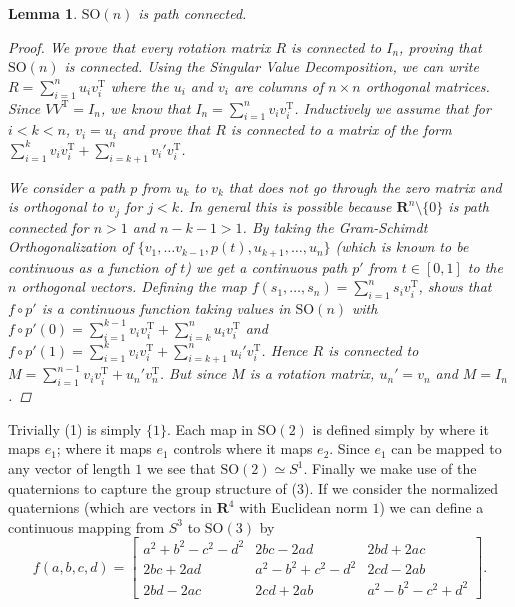 \documentclass[letterpaper,11pt]{article}
\newtheorem{lemma}{Lemma}
\newcommand{\Tr}{^\text{T}}
\newcommand{\reals}{\mathbf{R}}
\newcommand{\MG}[2]{{\text{#1}(#2)}}
\newcommand{\SOn}{\MG{SO}{n}}
\begin{document}
\begin{lemma}
$\SOn$ is path connected.
\begin{proof}
We prove that every rotation matrix $R$ is connected to $I_n$, proving that $\SOn$ is connected.
Using the Singular Value Decomposition, we can write $R = \sum_{i=1}^n u_i v_i\Tr$ where the $u_i$ and $v_i$ are columns of $n \times n$ orthogonal matrices.
Since $VV\Tr = I_n$, we know that $I_n = \sum_{i=1}^n v_i v_i\Tr$.
Inductively we assume that for $i<k<n$, $v_i = u_i$ and prove that $R$ is connected to a matrix of the form $\sum_{i=1}^k v_i v_i\Tr + \sum_{i=k+1}^n v_i'v_i\Tr$.

We consider a path $p$ from $u_k$ to $v_k$ that does not go through the zero matrix and is orthogonal to $v_j$ for $j<k$.
In general this is possible because $\reals^n \setminus \{0\}$ is path connected for $n>1$ and $n-k-1>1$.
By taking the Gram-Schimdt Orthogonalization of $\{ v_1, \ldots v_{k-1}, p(t), u_{k+1}, \ldots, u_n \}$ (which is known to be continuous as a function of $t$)
  we get a continuous path $p'$ from $t \in [0,1]$ to the $n$ orthogonal vectors. 
Defining the map $f(s_1, \ldots, s_n) = \sum_{i=1}^n s_i v_i\Tr$, shows that $f \circ p'$ is a continuous function taking values in $\SOn$
  with $f \circ p'(0) = \sum_{i=1}^{k-1} v_i v_i\Tr + \sum_{i=k}^n u_i v_i\Tr$ and $f \circ p'(1) = \sum_{i=1}^k v_i v_i\Tr + \sum_{i=k+1}^n u_i' v_i\Tr$.
Hence $R$ is connected to $M = \sum_{i=1}^{n-1} v_i v_i\Tr + u_n' v_n\Tr$. But since $M$ is a rotation matrix, $u_n' = v_n$ and $M = I_n$.
\end{proof}
\end{lemma}

Trivially \MG{SO}{1} is simply $\{1\}$. Each map in $\MG{SO}{2}$ is defined simply by where it maps $e_1$; where it maps $e_1$ controls where it maps $e_2$. Since $e_1$ can be mapped to any vector of length $1$ we see that $\MG{SO}{2} \simeq S^1$. Finally we make use of the quaternions to capture the group structure of \MG{SO}{3}. If we consider the normalized quaternions (which are vectors in $\reals^4$ with Euclidean norm $1$) we can define a continuous mapping from $S^3$ to $\MG{SO}{3}$ by 
\[
  f(a,b,c,d) = \begin{bmatrix} a^2 + b^2 - c^2 - d^2   & 2bc - 2ad & 2bd + 2ac \\ 2bc+2ad & a^2 - b^2 + c^2- d^2 & 2cd - 2ab \\ 2bd-2ac & 2cd +2ab & a^2-b^2-c^2+d^2 \end{bmatrix}.
\]
\end{document}
